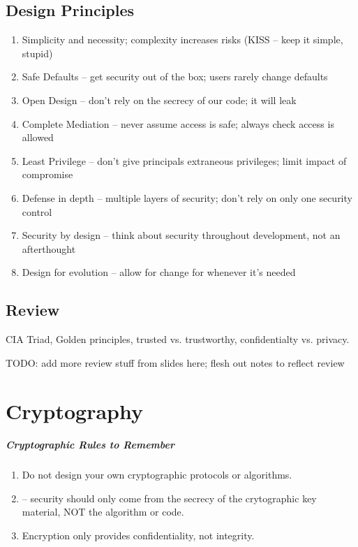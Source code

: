 \documentclass[12pt]{report}
\begin{document}
\section{Design Principles}
\begin{enumerate}
    \item Simplicity and necessity; complexity increases risks (KISS -- keep it simple, stupid)
    \item Safe Defaults -- get security out of the box; users rarely change defaults
    \item Open Design -- don't rely on the secrecy of our code; it will leak
    \item Complete Mediation -- never assume access is safe; always check access is allowed
    \item Least Privilege -- don't give principals extraneous privileges; limit impact of compromise
    \item Defense in depth -- multiple layers of security; don't rely on only one security control
    \item Security by design -- think about security throughout development, not an afterthought
    \item Design for evolution -- allow for change for whenever it's needed
\end{enumerate}

\section{Review}
CIA Triad, Golden principles, trusted vs. trustworthy, confidentialty vs. privacy.

TODO: add more review stuff from slides here; flesh out notes to reflect review

\chapter{Cryptography}
\paragraph{Cryptographic Rules to Remember}
\begin{enumerate}
    \item Do not design your own cryptographic protocols or algorithms.
    \item {} -- security should only come from the secrecy of the crytographic key material, NOT the algorithm or code.
    \item Encryption only provides confidentiality, not integrity.
\end{enumerate}
\end{document}
